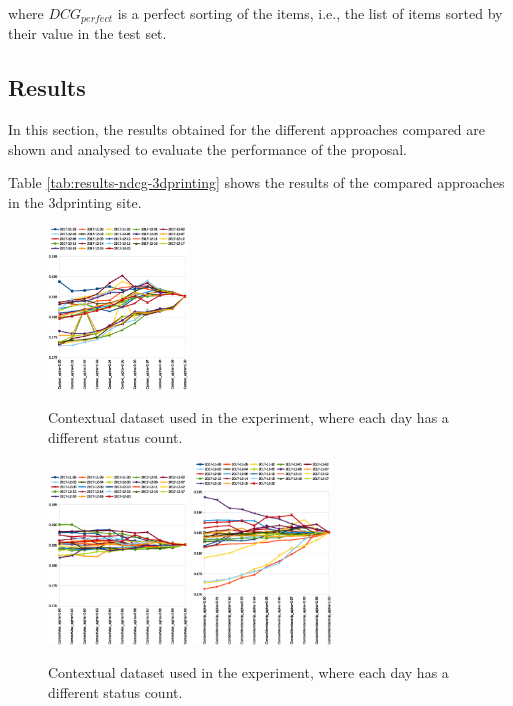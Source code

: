 \documentclass[preprint]{elsarticle}
\begin{document}
\begin{spacing}{2}
\noindent where $DCG_{perfect}$ is a perfect sorting of the items, i.e., the list of items sorted by their value in the test set.

\subsection{Results}

In this section, the results obtained for the different approaches compared are shown and analysed to evaluate the performance of the proposal.

Table \ref{tab:results-ndcg-3dprinting} shows the results of the compared approaches in the 3dprinting site.

\begin{figure}[htb]
    \centering
    \includegraphics[width=0.33\textwidth]{figures/ndcg-results-proposal-context-no-clustering.eps}
    \caption{Contextual dataset used in the experiment, where each day has a different status count.}
    \label{fig:ndcg-results-proposal-context-no-clustering}
    \includegraphics[width=0.33\textwidth]{figures/ndcg-results-proposal-context-fuzzy-clustering-max.eps}
    \label{fig:ndcg-results-proposal-context-fuzzy-clustering-max}
    \includegraphics[width=0.33\textwidth]{figures/ndcg-results-proposal-context-fuzzy-clustering-membership.eps}
    \caption{Contextual dataset used in the experiment, where each day has a different status count.}
    \label{fig:ndcg-results-proposal-context-fuzzy-clustering-membership}
\end{figure}


\end{spacing}
\end{document}
